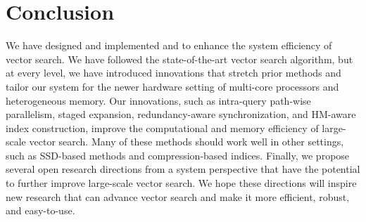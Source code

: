 \vspace{-1em}
\section{Conclusion}\label{minjia_sec:conclusion}

We have designed and implemented \Hammer and \name to enhance the system efficiency of vector search. We have followed the state-of-the-art vector search algorithm, but at every level, we have introduced innovations that stretch prior methods and tailor our system for the newer hardware setting of multi-core processors and heterogeneous memory. 
Our innovations, such as intra-query path-wise parallelism, staged expansion, redundancy-aware synchronization, and HM-aware index construction, improve the computational and memory efficiency of large-scale vector search. Many of these methods should work well in other settings, such as SSD-based methods and compression-based indices. Finally, we propose several open research directions from a system perspective that have the potential to further improve large-scale vector search. We hope these directions will inspire new research that can advance vector search and make it more efficient, robust, and easy-to-use.